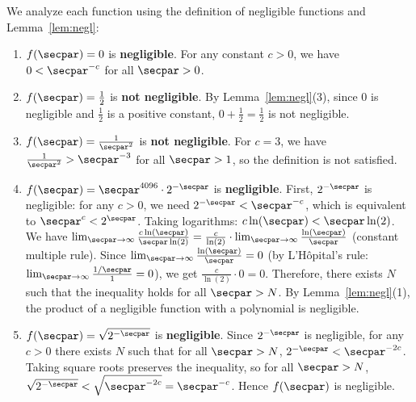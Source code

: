 \ifsolutions
\begin{mysolution}
  We analyze each function using the definition of negligible functions and Lemma~\ref{lem:negl}:
  \begin{enumerate}
    \item $f(\secpar) = 0$ is \textbf{negligible}.
    For any constant $c > 0$, we have $0 < \secpar^{-c}$ for all $\secpar > 0$.
    
    \item $f(\secpar) = \frac{1}{2}$ is \textbf{not negligible}.
    By Lemma~\ref{lem:negl}(3), since $0$ is negligible and $\frac{1}{2}$ is a positive constant, $0 + \frac{1}{2} = \frac{1}{2}$ is not negligible.
    
    \item $f(\secpar) = \frac{1}{\secpar^2}$ is \textbf{not negligible}.
    For $c = 3$, we have $\frac{1}{\secpar^2} > \secpar^{-3}$ for all $\secpar > 1$, so the definition is not satisfied.
    
    \item $f(\secpar) = \secpar^{4096} \cdot 2^{-\secpar}$ is \textbf{negligible}.
    First, $2^{-\secpar}$ is negligible: for any $c > 0$, we need $2^{-\secpar} < \secpar^{-c}$, which is equivalent to $\secpar^c < 2^{\secpar}$.
    Taking logarithms: $c \ln(\secpar) < \secpar \ln(2)$.
    We have $\lim_{\secpar \to \infty} \frac{c \ln(\secpar)}{\secpar \ln(2)} = \frac{c}{\ln(2)} \cdot \lim_{\secpar \to \infty} \frac{\ln(\secpar)}{\secpar}$ (constant multiple rule).
    Since $\lim_{\secpar \to \infty} \frac{\ln(\secpar)}{\secpar} = 0$ (by L'Hôpital's rule: $\lim_{\secpar \to \infty} \frac{1/\secpar}{1} = 0$), we get $\frac{c}{\ln(2)} \cdot 0 = 0$.
    Therefore, there exists $N$ such that the inequality holds for all $\secpar > N$.
    By Lemma~\ref{lem:negl}(1), the product of a negligible function with a polynomial is negligible.
    
    \item $f(\secpar) = \sqrt{2^{-\secpar}}$ is \textbf{negligible}.
    Since $2^{-\secpar}$ is negligible, for any $c > 0$ there exists $N$ such that for all $\secpar > N$,
    $2^{-\secpar} < \secpar^{-2c}$.
    Taking square roots preserves the inequality, so for all $\secpar > N$,
    $\sqrt{2^{-\secpar}} < \sqrt{\secpar^{-2c}} = \secpar^{-c}$.
    Hence $f(\secpar)$ is negligible.
  \end{enumerate}
\end{mysolution}
\fi

